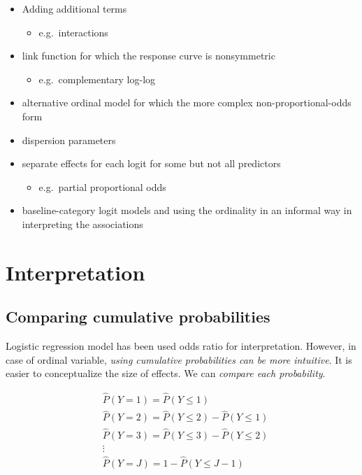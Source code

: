 \documentclass[]{book}
\providecommand{\tightlist}{%
  \setlength{\itemsep}{0pt}\setlength{\parskip}{0pt}}
\begin{document}
\begin{itemize}
\tightlist
\item
  Adding additional terms

  \begin{itemize}
  \tightlist
  \item
    e.g.~interactions
  \end{itemize}
\item
  link function for which the response curve is nonsymmetric

  \begin{itemize}
  \tightlist
  \item
    e.g.~complementary log-log
  \end{itemize}
\item
  alternative ordinal model for which the more complex non-proportional-odds form
\item
  dispersion parameters
\item
  separate effects for each logit for some but not all predictors

  \begin{itemize}
  \tightlist
  \item
    e.g.~partial proportional odds
  \end{itemize}
\item
  baseline-category logit models and using the ordinality in an informal way in interpreting the associations
\end{itemize}

\hypertarget{interpretation}{%
\section{Interpretation}\label{interpretation}}

\hypertarget{comparing-cumulative-probabilities}{%
\subsection{Comparing cumulative probabilities}\label{comparing-cumulative-probabilities}}

Logistic regression model has been used odds ratio for interpretation. However, in case of ordinal variable, \emph{using cumulative probabilities can be more intuitive}\citep{Agresti:2018aa}. It is easier to conceptualize the size of effects. We can \emph{compare each probability}.

\begin{equation}
\begin{split}
& \hat{P}(Y = 1) = \hat{P}(Y \le 1) \\
& \hat{P}(Y = 2) = \hat{P}(Y \le 2) - \hat{P}(Y \le 1) \\
& \hat{P}(Y = 3) = \hat{P}(Y \le 3) - \hat{P}(Y \le 2) \\
& \vdots \\
& \hat{P}(Y = J) = 1 - \hat{P}(Y \le J - 1)
\label{eq:fitt}
\end{split}
\end{equation}
\end{document}
